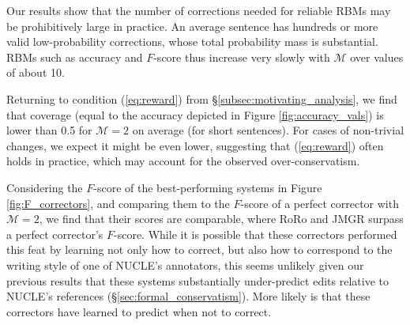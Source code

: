 \documentclass[letterpaper, 11pt]{article}
\begin{document}
Our results show that the number of corrections needed for reliable RBMs may be prohibitively large in practice.
An average sentence has hundreds or more valid low-probability corrections, whose total probability mass is substantial. 
RBMs such as accuracy and $F$-score thus increase very slowly with $\mathcal{M}$ over values of about 10.

%
%
%

Returning to condition (\ref{eq:reward}) from \S\ref{subsec:motivating_analysis}, we find that coverage (equal to the accuracy depicted in Figure \ref{fig:accuracy_vals}) is lower than 0.5 for $\mathcal{M}=2$ on average (for short sentences). For cases of non-trivial changes, we expect it might be even lower, suggesting that (\ref{eq:reward}) often holds in practice, which may account for the observed over-conservatism.

Considering the $F$-score of the best-performing systems in Figure \ref{fig:F_correctors}, and comparing them to the $F$-score of a perfect corrector with $\mathcal{M}=2$, we find that their scores are comparable, where RoRo and JMGR surpass a perfect corrector's $F$-score.
While it is possible that these correctors performed this feat by learning not only how to correct, but also how to correspond to the writing style of one of NUCLE's annotators, this seems unlikely given our previous results that these systems substantially under-predict edits relative to NUCLE's references (\S\ref{sec:formal_conservatism}). 
More likely is that these correctors have learned to predict when not to correct.
\end{document}
